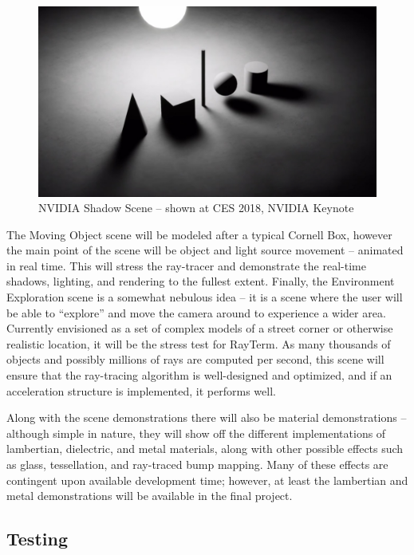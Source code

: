\documentclass[11pt]{article}
\newcommand{\name}{{\sc RayTerm}}
\begin{document}
\begin{figure}[htb]
  \centering
  \includegraphics[width=\textwidth]{resources/nvidia_shadows}
  \caption{NVIDIA Shadow Scene -- shown at CES 2018, NVIDIA Keynote}
  \label{fig:nvidia_shadows}
\end{figure}

The Moving Object scene will be modeled after a typical Cornell Box, however the main point of the scene will be object and light source movement -- animated in real time.
This will stress the ray-tracer and demonstrate the real-time shadows, lighting, and rendering to the fullest extent.
Finally, the Environment Exploration scene is a somewhat nebulous idea -- it is a scene where the user will be able to ``explore'' and move the camera around to experience a wider area.
Currently envisioned as a set of complex models of a street corner or otherwise realistic location, it will be the stress test for \name.
As many thousands of objects and possibly millions of rays are computed per second, this scene will ensure that the ray-tracing algorithm is well-designed and optimized, and if an acceleration structure is implemented, it performs well.

Along with the scene demonstrations there will also be material demonstrations -- although simple in nature, they will show off the different implementations of lambertian, dielectric, and metal materials, along with other possible effects such as glass, tessellation, and ray-traced bump mapping.
Many of these effects are contingent upon available development time; however, at least the lambertian and metal demonstrations will be available in the final project.


\subsection{Testing}
\label{sec:evaluate:testing}
\end{document}
